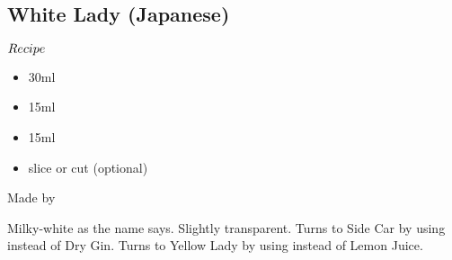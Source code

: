 \subsection{White Lady (Japanese)}
\begin{itembox}[l]{\boldmath $Recipe$}
\begin{itemize}
\setlength{\parskip}{0cm}
\setlength{\itemsep}{0cm}
\item \gin 30ml
\item \wc 15ml
\item \lj 15ml
\item \lemon slice or cut (optional)
\end{itemize}
\vspace{-4mm}
Made by \shake
\end{itembox}
Milky-white as the name says. Slightly transparent.
Turns to Side Car by using \brandy instead of Dry Gin.
Turns to Yellow Lady by using \oj instead of Lemon Juice.

